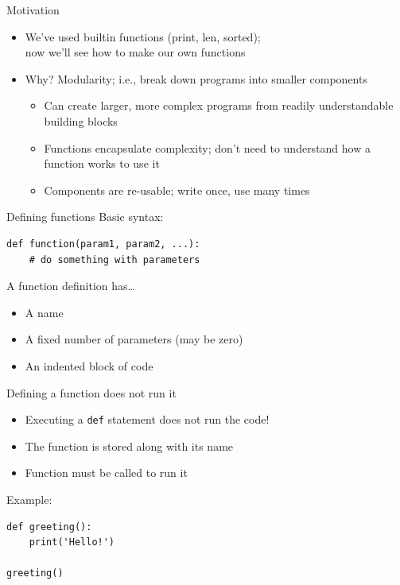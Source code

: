 \documentclass[aspectratio=169,usenames,dvipsnames]{beamer}
\begin{document}
\begin{frame}{Motivation}
    \begin{itemize}
        \item We've used builtin functions (print, len, sorted);\\
            now we'll see how to make our own functions
        \item Why? Modularity; i.e., break down programs into smaller components
            \begin{itemize}
                \item Can create larger, more complex programs
                    from readily understandable building blocks
                \item Functions encapsulate complexity;
                    don't need to understand how a function works to use it
                \item Components are re-usable;
                    write once, use many times
            \end{itemize}
    \end{itemize}
\end{frame}

\begin{frame}[fragile]{Defining functions}
    Basic syntax:
\begin{lstlisting}
def function(param1, param2, ...):
    # do something with parameters
\end{lstlisting}

    A function definition has\dots
    \begin{itemize}
        \item A name
        \item A fixed number of parameters (may be zero)
        \item An indented block of code
    \end{itemize}
\end{frame}

\begin{frame}[fragile]{Defining a function does not run it}
    \begin{itemize}
        \item Executing a \texttt{def} statement does not run the code!
        \item The function is stored along with its name
        \item Function must be called to run it
    \end{itemize}
    Example:
\begin{lstlisting}
def greeting():
    print('Hello!')

greeting()
\end{lstlisting}
\end{frame}
\end{document}
